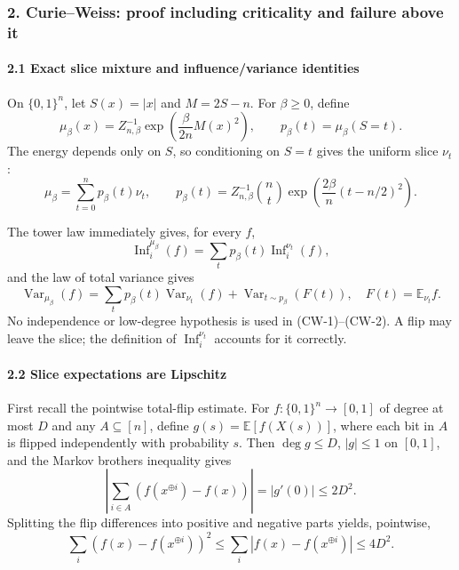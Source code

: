 \subsubsection{2. Curie--Weiss: proof including criticality and failure above it}\label{curieweiss-proof-including-criticality-and-failure-above-it}

\paragraph{2.1 Exact slice mixture and influence/variance identities}\label{exact-slice-mixture-and-influencevariance-identities}

On \(\{0,1\}^n\), let \(S(x)=|x|\) and \(M=2S-n\). For \(\beta\ge0\), define
\[
\mu_\beta(x)=Z_{n,\beta}^{-1}\exp\!\left(\frac{\beta}{2n}M(x)^2\right),\qquad
p_\beta(t)=\mu_\beta(S=t).
\]
The energy depends only on \(S\), so conditioning on \(S=t\) gives the uniform slice \(\nu_t\):
\[\mu_\beta=\sum_{t=0}^np_\beta(t)\nu_t,\qquad
p_\beta(t)=Z_{n,\beta}^{-1}\binom nt\exp\!\left(\frac{2\beta}{n}(t-n/2)^2\right).\]

The tower law immediately gives, for every \(f\),
\[
\operatorname{Inf}_i^{\mu_\beta}(f)=\sum_t p_\beta(t)\operatorname{Inf}_i^{\nu_t}(f), \tag{CW-1}
\]
and the law of total variance gives
\[
\operatorname{Var}_{\mu_\beta}(f)
=\sum_t p_\beta(t)\operatorname{Var}_{\nu_t}(f)
+\operatorname{Var}_{t\sim p_\beta}(F(t)),
\quad F(t)=\mathbb E_{\nu_t}f. \tag{CW-2}
\]
No independence or low-degree hypothesis is used in (CW-1)--(CW-2). A flip may leave the slice; the definition of \(\operatorname{Inf}_i^{\nu_t}\) accounts for it correctly.

\paragraph{2.2 Slice expectations are Lipschitz}\label{slice-expectations-are-lipschitz}

First recall the pointwise total-flip estimate. For \(f:\{0,1\}^n\to[0,1]\) of degree at most \(D\) and any \(A\subseteq[n]\), define \(g(s)=\mathbb E[f(X(s))]\), where each bit in \(A\) is flipped independently with probability \(s\). Then \(\deg g\le D\), \(|g|\le1\) on \([0,1]\), and the Markov brothers inequality gives
\[
\left|\sum_{i\in A}(f(x^{\oplus i})-f(x))\right|=|g'(0)|
\le2D^2. \tag{MB}
\]
Splitting the flip differences into positive and negative parts yields, pointwise,
\[
\sum_i(f(x)-f(x^{\oplus i}))^2
\le\sum_i|f(x)-f(x^{\oplus i})|\le4D^2. \tag{TF}
\]

